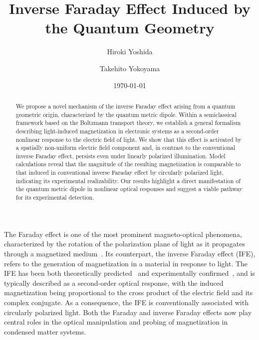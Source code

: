 \documentclass[aps,prb,longbibliography,superscriptaddress,twocolumn]{revtex4-2}
\begin{document}
\title{Inverse Faraday Effect Induced by the Quantum Geometry}

\author{Hiroki Yoshida}
\author{Takehito Yokoyama}


\date{\today}


\begin{abstract}
    We propose a novel mechanism of the inverse Faraday effect arising from a quantum geometric origin, characterized by the quantum metric dipole. Within a semiclassical framework based on the Boltzmann transport theory, we establish a general formalism describing light-induced magnetization in electronic systems as a second-order nonlinear response to the electric field of light. We show that this effect is activated by a spatially non-uniform electric field component and, in contrast to the conventional inverse Faraday effect, persists even under linearly polarized illumination. Model calculations reveal that the magnitude of the resulting magnetization is comparable to that induced in conventional inverse Faraday effect by circularly polarized light, indicating its experimental realizability. Our results highlight a direct manifestation of the quantum metric dipole in nonlinear optical responses and suggest a viable pathway for its experimental detection.
\end{abstract}

\maketitle

The Faraday effect is one of the most prominent magneto-optical phenomena, characterized by the rotation of the polarization plane of light as it propagates through a magnetized medium~\cite{Faraday_1846}. Its counterpart, the inverse Faraday effect (IFE), refers to the generation of magnetization in a material in response to light. The IFE has been both theoretically predicted~\cite{Pitaevskii_1961,Pershan_1963} and experimentally confirmed~\cite{Zeil_Optically_1965}, and is typically described as a second-order optical response, with the induced magnetization being proportional to the cross product of the electric field and its complex conjugate. As a consequence, the IFE is conventionally associated with circularly polarized light. Both the Faraday and inverse Faraday effects now play central roles in the optical manipulation and probing of magnetization in condensed matter systems.
\end{document}
